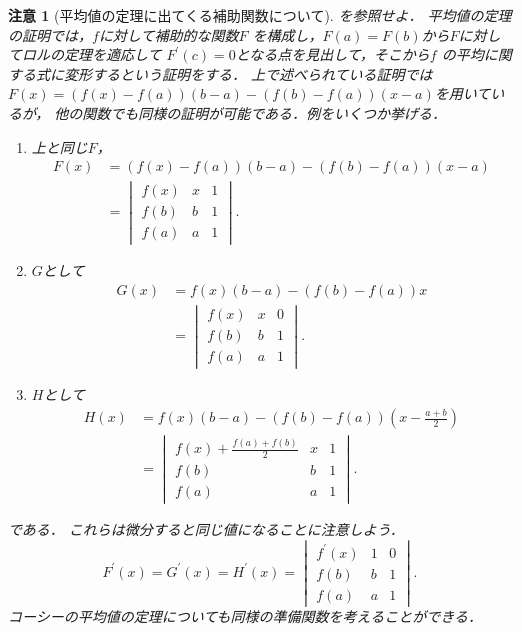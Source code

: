 \documentclass[leqno, a4paper, 12pt]{jsarticle}
\newtheorem*{rmk}{注意}
\begin{document}
\begin{rmk}[平均値の定理に出てくる補助関数について]
\cite{Tong}を参照せよ．
平均値の定理の証明では，$f$に対して補助的な関数$F$
を構成し，$F(a)=F(b)$から$F$に対してロルの定理を適応して
$F^{\prime}(c)=0$となる点を見出して，そこから$f$
の平均に関する式に変形するという証明をする．
上で述べられている証明では
$F(x)=(f(x)-f(a))(b-a)-(f(b)-f(a))(x-a)$を用いているが，
他の関数でも同様の証明が可能である．例をいくつか挙げる．
\begin{enumerate}
\item
上と同じ$F$， 
\begin{align*}
F(x)&=(f(x)-f(a))(b-a)-(f(b)-f(a))(x-a)\\
&=
\begin{vmatrix}
f(x) & x & 1\\
f(b) & b & 1\\
f(a) & a & 1
\end{vmatrix}. 
\end{align*}

\item $G$として
\begin{align*}
G(x)&=f(x)(b-a)-(f(b)-f(a))x\\
&=
\begin{vmatrix}
f(x) & x & 0\\
f(b) & b & 1\\
f(a) & a & 1
\end{vmatrix}. 
\end{align*}
\item 
$H$として
\begin{align*}
H(x)&=f(x)(b-a)-(f(b)-f(a))\left(x-\frac{a+b}{2}\right)\\
&=
\begin{vmatrix}
f(x)+\frac{f(a)+f(b)}{2} & x & 1\\
f(b) & b & 1\\
f(a) & a & 1
\end{vmatrix}. 
\end{align*}
\end{enumerate}
である．
これらは微分すると同じ値になることに注意しよう．
\[
F^{\prime}(x)=G^{\prime}(x)
=H^{\prime}(x)
=
\begin{vmatrix}
f^{\prime}(x) & 1 & 0\\
f(b) & b & 1\\
f(a) & a & 1
\end{vmatrix}. 
\]
コーシーの平均値の定理についても同様の準備関数を考えることができる．
\end{rmk}
\end{document}
